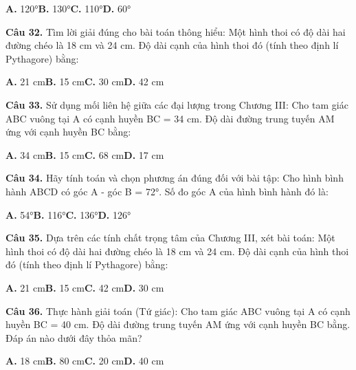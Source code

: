 \documentclass[11pt,a4paper]{article}
\begin{document}
\hspace*{1.5em}\textbf{A.} 120°\quad\quad \textbf{B.} 130°\quad\quad \textbf{C.} 110°\quad\quad \textbf{D.} 60°\par\vspace{2pt}
\textbf{\color{primary} Câu 32.} Tìm lời giải đúng cho bài toán thông hiểu: Một hình thoi có độ dài hai đường chéo là 18 cm và 24 cm. Độ dài cạnh của hình thoi đó (tính theo định lí Pythagore) bằng:\par
\hspace*{1.5em}\textbf{A.} 21 cm\quad\quad \textbf{B.} 15 cm\quad\quad \textbf{C.} 30 cm\quad\quad \textbf{D.} 42 cm\par\vspace{2pt}
\textbf{\color{primary} Câu 33.} Sử dụng mối liên hệ giữa các đại lượng trong Chương III: Cho tam giác ABC vuông tại A có cạnh huyền BC = 34 cm. Độ dài đường trung tuyến AM ứng với cạnh huyền BC bằng:\par
\hspace*{1.5em}\textbf{A.} 34 cm\quad\quad \textbf{B.} 15 cm\quad\quad \textbf{C.} 68 cm\quad\quad \textbf{D.} 17 cm\par\vspace{2pt}
\textbf{\color{primary} Câu 34.} Hãy tính toán và chọn phương án đúng đối với bài tập: Cho hình bình hành ABCD có góc A - góc B = 72°. Số đo góc A của hình bình hành đó là:\par
\hspace*{1.5em}\textbf{A.} 54°\quad\quad \textbf{B.} 116°\quad\quad \textbf{C.} 136°\quad\quad \textbf{D.} 126°\par\vspace{2pt}
\textbf{\color{primary} Câu 35.} Dựa trên các tính chất trọng tâm của Chương III, xét bài toán: Một hình thoi có độ dài hai đường chéo là 18 cm và 24 cm. Độ dài cạnh của hình thoi đó (tính theo định lí Pythagore) bằng:\par
\hspace*{1.5em}\textbf{A.} 21 cm\quad\quad \textbf{B.} 15 cm\quad\quad \textbf{C.} 42 cm\quad\quad \textbf{D.} 30 cm\par\vspace{2pt}
\textbf{\color{primary} Câu 36.} Thực hành giải toán (Tứ giác): Cho tam giác ABC vuông tại A có cạnh huyền BC = 40 cm. Độ dài đường trung tuyến AM ứng với cạnh huyền BC bằng. Đáp án nào dưới đây thỏa mãn?\par
\hspace*{1.5em}\textbf{A.} 18 cm\quad\quad \textbf{B.} 80 cm\quad\quad \textbf{C.} 20 cm\quad\quad \textbf{D.} 40 cm\par\vspace{2pt}
\end{document}
